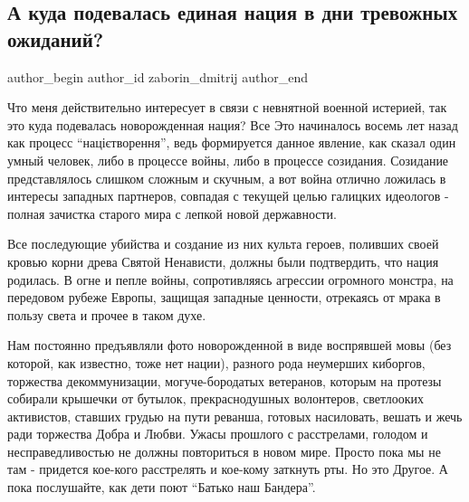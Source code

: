  
 
 
 
 
 
\subsection{А куда подевалась единая нация в дни тревожных ожиданий?}
\label{sec:31_01_2022.fb.zaborin_dmitrij.1.jedinaja_nacia}
 
\ifcmt
 author_begin
   author_id zaborin_dmitrij
 author_end
\fi

Что меня действительно интересует в связи с невнятной военной истерией, так это
куда подевалась новорожденная нация? Все Это начиналось восемь лет назад как
процесс \enquote{націєтворення}, ведь формируется данное явление, как сказал
один умный человек, либо в процессе войны, либо в процессе созидания. Созидание
представлялось слишком сложным и скучным, а вот война отлично ложилась в
интересы западных партнеров, совпадая с текущей целью галицких идеологов -
полная зачистка старого мира с лепкой новой державности. 

Все последующие убийства и создание из них культа героев, поливших своей кровью
корни древа Святой Ненависти, должны были подтвердить, что нация родилась. В
огне и пепле войны, сопротивляясь агрессии огромного монстра, на передовом
рубеже Европы, защищая западные ценности, отрекаясь от мрака в пользу света и
прочее в таком духе. 

Нам постоянно предъявляли фото новорожденной в виде воспрявшей мовы (без
которой, как известно, тоже нет нации), разного рода неумерших киборгов,
торжества декоммунизации, могуче-бородатых ветеранов, которым на протезы
собирали крышечки от бутылок, прекраснодушных волонтеров, светлооких
активистов, ставших грудью на пути реванша, готовых насиловать, вешать и жечь
ради торжества Добра и Любви. Ужасы прошлого с расстрелами, голодом и
несправедливостью не должны повториться в новом мире. Просто пока мы не там -
придется кое-кого расстрелять и кое-кому заткнуть рты. Но это Другое. А пока
послушайте, как дети поют \enquote{Батько наш Бандера}.

